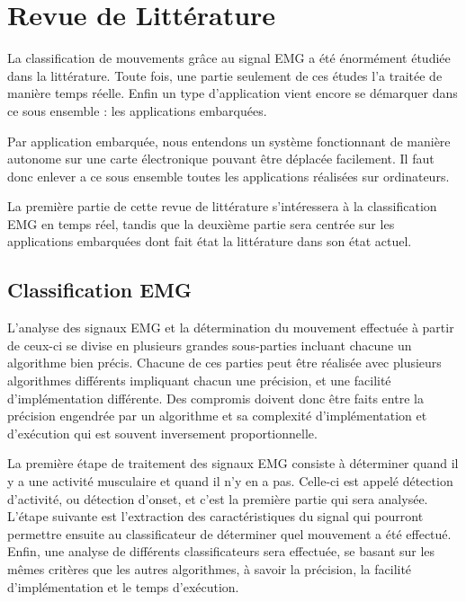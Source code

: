 \documentclass[letterpaper, twoside, 12pt, memoire, creativecommons, hyperref]{thETS}
\begin{document}
\chapter{Revue de Littérature}

%


La classification de mouvements grâce au signal EMG a été énormément étudiée dans la littérature. Toute fois, une partie seulement de ces études l'a traitée de manière temps réelle. Enfin un type d'application vient encore se démarquer dans ce sous ensemble : les applications embarquées. 

Par application embarquée, nous entendons un système fonctionnant de manière autonome sur une carte électronique pouvant être déplacée facilement. Il faut donc enlever a ce sous ensemble toutes les applications réalisées sur ordinateurs. 

La première partie de cette revue de littérature s’intéressera à la classification EMG en temps réel, tandis que la deuxième partie sera centrée sur les applications embarquées dont fait état la littérature dans son état actuel.

\section{Classification EMG}

L’analyse des signaux EMG et la détermination du mouvement effectuée à partir de ceux-ci se divise en plusieurs grandes sous-parties incluant chacune un algorithme bien précis. Chacune de ces parties peut être réalisée avec plusieurs algorithmes différents impliquant chacun une précision, et une facilité d’implémentation différente. Des compromis doivent donc être faits entre la précision engendrée par un algorithme et sa complexité d’implémentation et d’exécution qui est souvent inversement proportionnelle. 

La première étape de traitement des signaux EMG consiste à déterminer quand il y a une activité musculaire et quand il n’y en a pas. Celle-ci est appelé détection d’activité, ou détection d'onset, et c’est la première partie qui sera analysée. L’étape suivante est l’extraction des caractéristiques du signal qui pourront permettre ensuite au classificateur de déterminer quel mouvement a été effectué. Enfin, une analyse de différents classificateurs sera effectuée, se basant sur les mêmes critères que les autres algorithmes, à savoir la précision, la facilité d’implémentation et le temps d’exécution. 
\end{document}
